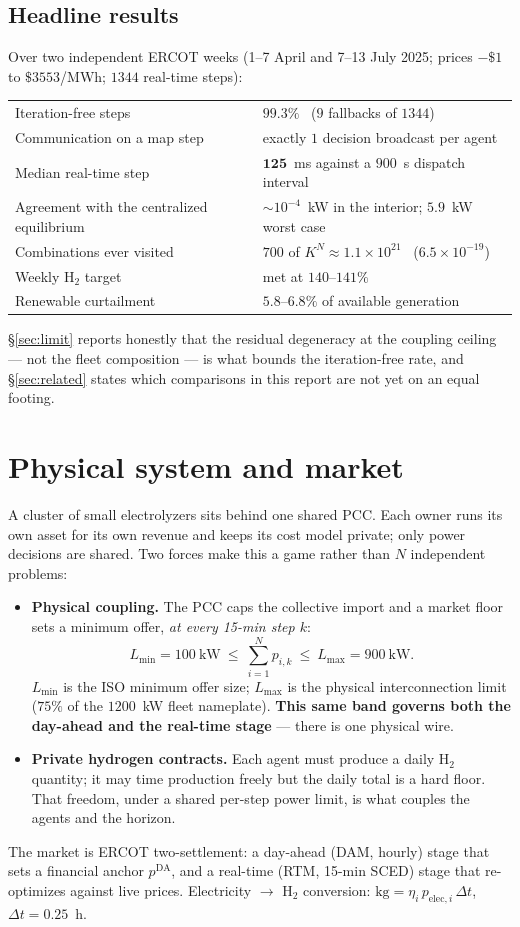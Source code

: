 \documentclass[11pt, letterpaper]{article}
\begin{document}
\subsection{Headline results}
Over two independent ERCOT weeks (1--7 April and 7--13 July 2025; prices $-\$1$ to $\$3553$/MWh;
$1344$ real-time steps):
\begin{center}\small
\begin{tabular}{ll}
\toprule
Iteration-free steps & $\mathbf{99.3\%}$ \ ($9$ fallbacks of $1344$)\\
Communication on a map step & exactly $1$ decision broadcast per agent\\
Median real-time step & $\mathbf{125}$~ms against a $900$~s dispatch interval\\
Agreement with the centralized equilibrium & $\sim\!10^{-4}$~kW in the interior; $5.9$~kW worst case\\
Combinations ever visited & $700$ of $K^N\approx1.1\times10^{21}$ \ ($6.5\times10^{-19}$)\\
Weekly H$_2$ target & met at $140$--$141\%$\\
Renewable curtailment & $5.8$--$6.8\%$ of available generation\\
\bottomrule
\end{tabular}
\end{center}
\S\ref{sec:limit} reports honestly that the residual degeneracy at the coupling ceiling --- not the
fleet composition --- is what bounds the iteration-free rate, and \S\ref{sec:related} states which
comparisons in this report are not yet on an equal footing.

\section{Physical system and market}
A cluster of small electrolyzers sits behind one shared PCC. Each owner runs its own asset for its
own revenue and keeps its cost model private; only power decisions are shared. Two forces make this
a game rather than $N$ independent problems:
\begin{itemize}[nosep]
\item \textbf{Physical coupling.} The PCC caps the collective import and a market floor sets a
minimum offer, \emph{at every 15-min step $k$}:
\[
   L_{\min}=100\ \text{kW}\ \le\ \sum_{i=1}^{N} p_{i,k}\ \le\ L_{\max}=900\ \text{kW}.
\]
$L_{\min}$ is the ISO minimum offer size; $L_{\max}$ is the physical interconnection limit
($75\%$ of the $1200$~kW fleet nameplate). \textbf{This same band governs both the day-ahead and the
real-time stage} --- there is one physical wire.
\item \textbf{Private hydrogen contracts.} Each agent must produce a daily H$_2$ quantity; it may
time production freely but the daily total is a hard floor. That freedom, under a shared per-step
power limit, is what couples the agents and the horizon.
\end{itemize}
The market is ERCOT two-settlement: a day-ahead (DAM, hourly) stage that sets a financial anchor
$p^{\mathrm{DA}}$, and a real-time (RTM, 15-min SCED) stage that re-optimizes against live prices.
Electricity $\to$ H$_2$ conversion: $\text{kg}=\eta_i\,p_{\mathrm{elec},i}\,\Delta t$, $\Delta t=0.25$~h.
\end{document}
